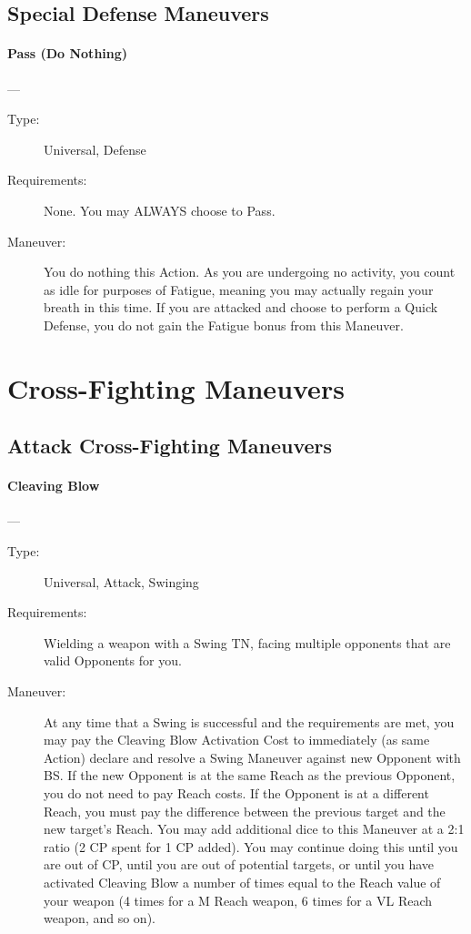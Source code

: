 \documentclass[oneside,11pt,english]{book}
\begin{document}
\subsection{Special Defense Maneuvers}
\paragraph{\large\label{man:Pass (Do Nothing)}Pass (Do Nothing)}---\quad{\large[None]}
\vspace{-10pt}\begin{description}
\item [Type:] Universal, Defense
\item [Requirements:] None. You may ALWAYS choose to Pass. 
\item [Maneuver:] You do nothing this Action. As you are undergoing no activity, you count as idle for purposes of Fatigue, meaning you may actually regain your breath in this time. If you are attacked and choose to perform a Quick Defense, you do not gain the Fatigue bonus from this Maneuver.
\end{description}
\section{Cross-Fighting Maneuvers}
\subsection{Attack Cross-Fighting Maneuvers}
\paragraph{\large\label{man:Cleaving Blow}Cleaving Blow}---\quad{\large[2]}
\vspace{-10pt}\begin{description} 
\item [Type:] Universal, Attack, Swinging 
\item [Requirements:] Wielding a weapon with a Swing TN, facing multiple opponents that are valid Opponents 
  for you. 
\item [Maneuver:] At any time that a Swing is successful and the requirements are met, you may pay the 
  Cleaving Blow Activation Cost to immediately (as same Action) declare and resolve a Swing Maneuver 
  against new Opponent with BS. If the new Opponent is at the same Reach as the previous Opponent, you 
  do not need to pay Reach costs. If the Opponent is at a different Reach, you must pay the difference 
  between the previous target and the new target’s Reach. 
  You may add additional dice to this Maneuver at a 2:1 ratio (2 CP spent for 1 CP added). You may 
  continue doing this until you are out of CP, until you are out of potential targets, or until you have 
  activated Cleaving Blow a number of times equal to the Reach value of your weapon (4 times for a M 
  Reach weapon, 6 times for a VL Reach weapon, and so on). 
\end{description}
\end{document}
